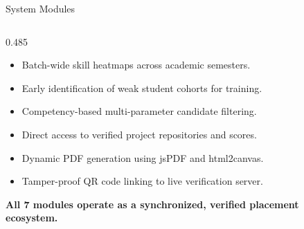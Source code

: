 \documentclass[aspectratio=169,10pt,xcolor={table,dvipsnames}]{beamer}
\begin{document}
\begin{frame}[t]{System Modules}
\begin{columns}[T]
    \begin{column}{0.485\textwidth}
      \begin{tcolorbox}[modcard,title={5.\;Institutional Skill Analytics (TPO Console)}]
        \fontsize{6.0}{7.0}\selectfont
        \begin{itemize}\setlength{\itemsep}{0pt}
          \item Batch-wide skill heatmaps across academic semesters.
          \item Early identification of weak student cohorts for training.
        \end{itemize}
      \end{tcolorbox}\vspace{0.03cm}

      \begin{tcolorbox}[modcard,title={6.\;Recruiter Candidate Screening Module}]
        \fontsize{6.0}{7.0}\selectfont
        \begin{itemize}\setlength{\itemsep}{0pt}
          \item Competency-based multi-parameter candidate filtering.
          \item Direct access to verified project repositories and scores.
        \end{itemize}
      \end{tcolorbox}\vspace{0.03cm}

      \begin{tcolorbox}[modcard,title={7.\;QR-Authenticated Transcript Generator}]
        \fontsize{6.0}{7.0}\selectfont
        \begin{itemize}\setlength{\itemsep}{0pt}
          \item Dynamic PDF generation using jsPDF and html2canvas.
          \item Tamper-proof QR code linking to live verification server.
        \end{itemize}
      \end{tcolorbox}\vspace{0.03cm}

      \begin{tcolorbox}[
        enhanced,colback=LightSilver,colframe=BorderColor,
        arc=2pt,boxrule=0.5pt,
        left=4pt,right=4pt,top=2pt,bottom=2pt]
        \centering\fontsize{6.0}{7.0}\selectfont\bfseries\color{Navy}
        All 7 modules operate as a synchronized, verified placement ecosystem.
      \end{tcolorbox}
    \end{column}
  \end{columns}
\end{frame}
\end{document}
